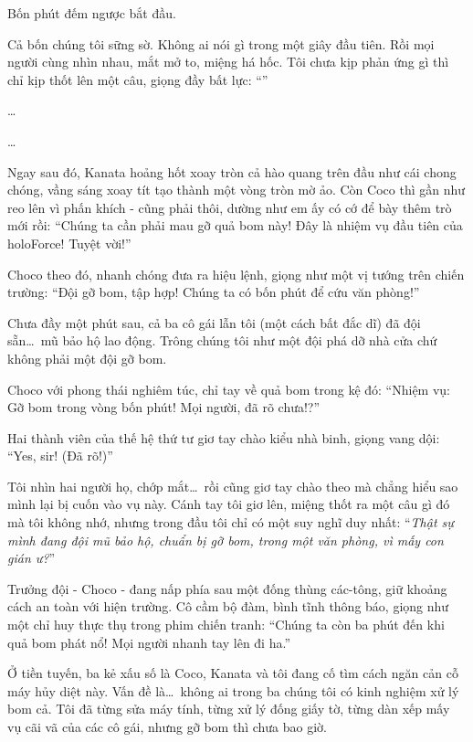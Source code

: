 \documentclass[../main.tex]{subfiles}
\begin{document}
Bốn phút đếm ngược bắt đầu.

Cả bốn chúng tôi sững sờ. Không ai nói gì trong một giây đầu tiên. Rồi mọi người cùng nhìn nhau, mắt mở to, miệng há hốc. Tôi chưa kịp phản ứng gì thì chỉ kịp thốt lên một câu, giọng đầy bất lực: ``''

\dots

\dots

Ngay sau đó, Kanata hoảng hốt xoay tròn cả hào quang trên đầu như cái chong chóng, vầng sáng xoay tít tạo thành một vòng tròn mờ ảo. Còn Coco thì gần như reo lên vì phấn khích - cũng phải thôi, dường như em ấy có cớ để bày thêm trò mới rồi: ``Chúng ta cần phải mau gỡ quả bom này! Đây là nhiệm vụ đầu tiên của holoForce! Tuyệt vời!''

Choco theo đó, nhanh chóng đưa ra hiệu lệnh, giọng như một vị tướng trên chiến trường: ``Đội gỡ bom, tập hợp! Chúng ta có bốn phút để cứu văn phòng!''

Chưa đầy một phút sau, cả ba cô gái lẫn tôi (một cách bất đắc dĩ) đã đội sẵn\dots\ mũ bảo hộ lao động. Trông chúng tôi như một đội phá dỡ nhà cửa chứ không phải một đội gỡ bom.

Choco với phong thái nghiêm túc, chỉ tay về quả bom trong kệ đó: ``Nhiệm vụ: Gỡ bom trong vòng bốn phút! Mọi người, đã rõ chưa!?''

Hai thành viên của thế hệ thứ tư giơ tay chào kiểu nhà binh, giọng vang dội: ``Yes, sir! (Đã rõ!)''


Tôi nhìn hai người họ, chớp mắt\dots\ rồi cũng giơ tay chào theo mà chẳng hiểu sao mình lại bị cuốn vào vụ này. Cánh tay tôi giơ lên, miệng thốt ra một câu gì đó mà tôi không nhớ, nhưng trong đầu tôi chỉ có một suy nghĩ duy nhất: ``\textit{Thật sự mình đang đội mũ bảo hộ, chuẩn bị gỡ bom, trong một văn phòng, vì mấy con gián ư?}''

\ct

Trưởng đội - Choco - đang nấp phía sau một đống thùng các-tông, giữ khoảng cách an toàn với hiện trường. Cô cầm bộ đàm, bình tĩnh thông báo, giọng như một chỉ huy thực thụ trong phim chiến tranh: ``Chúng ta còn ba phút đến khi quả bom phát nổ! Mọi người nhanh tay lên đi ha.''

Ở tiền tuyến, ba kẻ xấu số là Coco, Kanata và tôi đang cố tìm cách ngăn cản cỗ máy hủy diệt này. Vấn đề là\dots\ không ai trong ba chúng tôi có kinh nghiệm xử lý bom cả. Tôi đã từng sửa máy tính, từng xử lý đống giấy tờ, từng dàn xếp mấy vụ cãi vã của các cô gái, nhưng gỡ bom thì chưa bao giờ.
\end{document}
